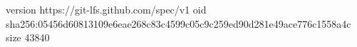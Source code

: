 version https://git-lfs.github.com/spec/v1
oid sha256:05456d60813109e6eae268c83c4599c05c9c259ed90d281e49ace776c1558a4c
size 43840

